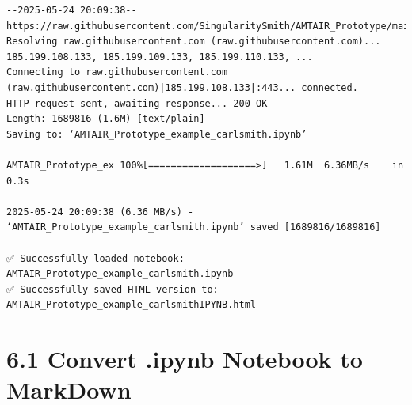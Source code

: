 \documentclass[
  11pt,
  letterpaper,
]{book}
\begin{document}
\begin{verbatim}
--2025-05-24 20:09:38--  https://raw.githubusercontent.com/SingularitySmith/AMTAIR_Prototype/main/data/example_carlsmith/AMTAIR_Prototype_example_carlsmith.ipynb
Resolving raw.githubusercontent.com (raw.githubusercontent.com)... 185.199.108.133, 185.199.109.133, 185.199.110.133, ...
Connecting to raw.githubusercontent.com (raw.githubusercontent.com)|185.199.108.133|:443... connected.
HTTP request sent, awaiting response... 200 OK
Length: 1689816 (1.6M) [text/plain]
Saving to: ‘AMTAIR_Prototype_example_carlsmith.ipynb’

AMTAIR_Prototype_ex 100%[===================>]   1.61M  6.36MB/s    in 0.3s    

2025-05-24 20:09:38 (6.36 MB/s) - ‘AMTAIR_Prototype_example_carlsmith.ipynb’ saved [1689816/1689816]

✅ Successfully loaded notebook: AMTAIR_Prototype_example_carlsmith.ipynb
✅ Successfully saved HTML version to: AMTAIR_Prototype_example_carlsmithIPYNB.html
\end{verbatim}

\section{6.1 Convert .ipynb Notebook to
MarkDown}\label{convert-.ipynb-notebook-to-markdown}
\end{document}
